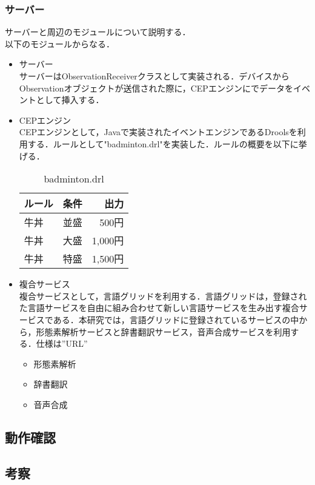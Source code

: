 \documentclass{kuisthesis}			%
\begin{document}
\subsubsection{サーバー}
サーバーと周辺のモジュールについて説明する．\\
以下のモジュールからなる．\\
\begin{itemize}
\item サーバー\\
サーバーはObservationReceiverクラスとして実装される．デバイスからObservationオブジェクトが送信された際に，CEPエンジンにでデータをイベントとして挿入する．
\item CEPエンジン\\
CEPエンジンとして，Javaで実装されたイベントエンジンであるDroolsを利用する．ルールとして"badminton.drl"を実装した．ルールの概要を以下に挙げる．
\begin{table}[htb]
  \begin{center}
    \caption{badminton.drl}
    \begin{tabular}{|l|c|r|} \hline
      ルール & 条件 & 出力 \\ \hline \hline
      牛丼 & 並盛 & 500円 \\
      牛丼 & 大盛 & 1,000円 \\
      牛丼 & 特盛 & 1,500円 \\ \hline
    \end{tabular}
  \end{center}
\end{table}
\item 複合サービス\\
複合サービスとして，言語グリッドを利用する．言語グリッドは，登録された言語サービスを自由に組み合わせて新しい言語サービスを生み出す複合サービスである．本研究では，言語グリッドに登録されているサービスの中から，形態素解析サービスと辞書翻訳サービス，音声合成サービスを利用する．仕様は”URL”
\begin{itemize}
\item 形態素解析
\item 辞書翻訳
\item 音声合成
\end{itemize}
\end{itemize}


\subsection{動作確認}
\subsection{考察}
\end{document}
